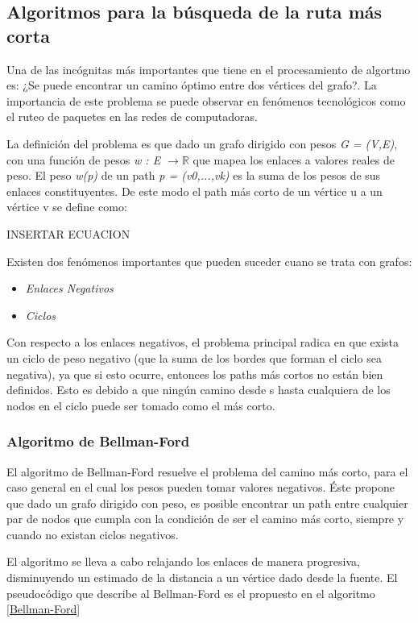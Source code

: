 \documentclass[a4paper, 11pt]{report}
\begin{document}
\newpage
\subsection{Algoritmos para la b\'usqueda de la ruta m\'as corta}
Una de las inc\'ognitas m\'as importantes que tiene en el procesamiento de algortmo es: ¿Se puede encontrar un camino \'optimo entre dos v\'ertices del grafo?. La importancia de este problema se puede observar en fen\'omenos tecnol\'ogicos como el ruteo de paquetes en las redes de computadoras. 

La definici\'on del problema es que dado un grafo dirigido con pesos \textit{G = (V,E)}, con una funci\'on de pesos \textit{w : E $\longrightarrow \mathbb{R}$} que mapea los enlaces a valores reales de peso. El peso \textit{w(p)} de un path \textit{p = (v0,...,vk)} es la suma de los pesos de sus enlaces constituyentes. De este modo el path m\'as corto de un v\'ertice u a un v\'ertice v se define como:

INSERTAR ECUACION

Existen dos fen\'omenos importantes que pueden suceder cuano se trata con grafos:
\begin{itemize}
    \item \textit{Enlaces Negativos}
    \item \textit{Ciclos}
\end{itemize}

Con respecto a los enlaces negativos, el problema principal radica en que exista un ciclo de peso negativo (que la suma de los bordes que forman el ciclo sea negativa), ya que si esto ocurre, entonces los paths m\'as cortos no est\'an bien definidos. Esto es debido a que ning\'un camino desde s hasta cualquiera de los nodos en el ciclo puede ser tomado como el m\'as corto.

\subsubsection{Algoritmo de Bellman-Ford}
El algoritmo de Bellman-Ford resuelve el problema del camino m\'as corto, para el caso general en el cual los pesos pueden tomar valores negativos. \'Este propone que dado un grafo dirigido con peso, es posible encontrar un path entre cualquier par de nodos que cumpla con la condici\'on de ser el camino m\'as corto, siempre y cuando no existan ciclos negativos.

El algoritmo se lleva a cabo relajando los enlaces de manera progresiva, disminuyendo un estimado de la distancia a un v\'ertice dado desde la fuente. El pseudoc\'odigo que describe al Bellman-Ford es el propuesto en el algoritmo \ref{Bellman-Ford}
\end{document}
